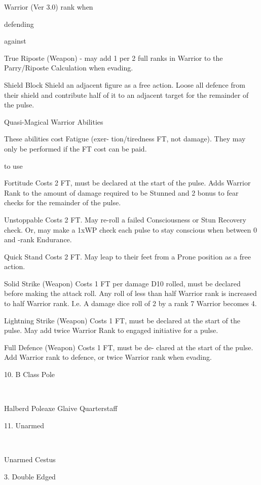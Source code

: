 \begin{Chapter}{Warrior (Ver 3.0)}
rank  when 

defending 

against 

True  Riposte  (Weapon)  -  may  add  1  per  2  full 
ranks  in  Warrior  to  the  Parry/Riposte  Calculation 
when evading.  

Shield  Block  Shield  an  adjacent  figure  as  a  free 
action.  Loose  all  defence  from  their  shield  and 
contribute  half  of  it  to  an  adjacent  target  for  the 
remainder of the pulse.  

Quasi-Magical Warrior Abilities  

These  abilities  cost  Fatigue 
(exer-
tion/tiredness FT,  not  damage).  They  may  only  be 
performed if the FT cost can be paid.  

to  use 

Fortitude Costs 2 FT, must be declared at the start 
of the pulse.  Adds Warrior Rank to the amount of 
damage  required  to  be  Stunned  and  2%
bonus to fear checks for the remainder of the pulse.  

Unstoppable  Costs  2  FT.  May  re-roll  a  failed 
Consciousness  or  Stun  Recovery  check.  Or,  may 
make  a  1xWP  check  each  pulse  to  stay  conscious 
when between 0 and -rank Endurance.  

Quick  Stand  Costs  2  FT.  May  leap  to  their  feet 
from a Prone position as a free action.  

Solid  Strike  (Weapon)  Costs  1  FT  per  damage 
D10  rolled,  must  be  declared  before  making  the 
attack roll.  Any  roll of less than half Warrior rank 
is  increased  to  half  Warrior  rank.  I.e.  A  damage 
dice roll of 2 by a rank 7 Warrior becomes 4.  

Lightning  Strike  (Weapon)  Costs  1  FT,  must  be 
declared  at  the  start  of  the  pulse.  May  add  twice 
Warrior Rank to engaged initiative for a pulse.  

Full  Defence  (Weapon)  Costs  1  FT,  must  be  de-
clared at the start of the pulse. Add Warrior rank to 
defence, or twice Warrior rank when evading.  

10. B Class Pole  

 
 
 
 

Halberd  
Poleaxe  
Glaive  
Quarterstaff 

11. Unarmed  

 
 

Unarmed  
Cestus 

3. Double Edged  


\end{Chapter}
